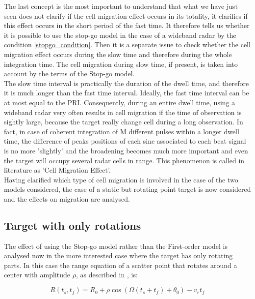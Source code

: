 The last concept is the most important to understand that what we have just seen does not clarify if the cell migration effect occurs in its totality, it clarifies if this effect occurs in the short period of the fast time. It therefore tells us whether it is possible to use the stop-go model in the case of a wideband radar by the condition \ref{stopgo_condition}. Then it is a separate issue to check whether the cell migration effect occurs during the slow time and therefore during the whole integration time. The cell migration during slow time, if present, is taken into account by the terms of the Stop-go model.\\
The slow time interval is practically the duration of the dwell time, and therefore it is much longer than the fast time interval. Ideally, the fast time interval can be at most equal to the PRI.
Consequently, during an entire dwell time, using a wideband radar very often results in cell migration if the time of observation is sightly large, because the target really change cell during a long observation.
In fact, in case of coherent integration of M different pulses within a longer dwell time, the difference of peaks positions of each sinc associated to each beat signal is no more 'slightly' and the broadening becomes much more important and even the target will occupy several radar cells in range. This phenomenon is called in literature as 'Cell Migration Effect'.\\
Having clarified which type of cell migration is involved in the case of the two models considered, the case of a static but rotating point target is now considered and the effects on migration are analysed.
\subsection{Target with only rotations}
The effect of using the Stop-go model rather than the First-order model is analysed now in the more interested case where the target has only rotating parts. In this case the range equation of a scatter point that rotates around a center with amplitude $\rho$, as described in \cite{chen_chinese}, is:

\begin{equation}
R\left(t_{s},t_{f}\right)=R_{0}+\rho \cos \left(\Omega (t_{s}+t_{f})+\theta_{0}\right) - v_{r} t_{f}
\label{rotaionfirstorder}
\end{equation}

